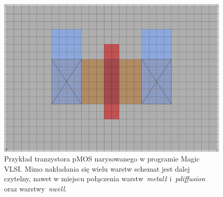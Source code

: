 \begin{figure}[h]
    \centering
    \includegraphics[width=.8\textwidth]{chapters/chapter2/img/magic_tran}
    \caption{Przykład tranzystora pMOS narysowanego w programie Magic VLSI\@.
    Mimo nakładania się wielu warstw schemat jest dalej czytelny,
    nawet w miejscu połączenia warstw~\textit{metal1} i~\textit{pdiffusion} oraz warstwy~\textit{nwell}.}
    \label{fig:magic_tran}
\end{figure}

